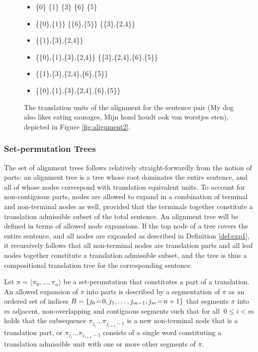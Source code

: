 \begin{figure}[!ht]
\begin{framed}
\small{
\begin{itemize}
\item \{0\} \hfill \{1\} \hfill \{3\} \hfill \{6\} \hfill \{5\} \hfill
\item \{\{0\},\{1\}\} \hfill  \{\{6\},\{5\}\} \hfill \{\{3\},\{2,4\}\}
\item \{\{1\},\{3\},\{2,4\}\}
\item \{\{0\},\{1\},\{3\},\{2,4\}\} \hfill \{\{3\},\{2,4\},\{6\},\{5\}\}
\item \{\{1\},\{3\},\{2,4\},\{6\},\{5\}\}
\item \{\{0\},\{1\},\{3\},\{2,4\},\{6\},\{5\}\}
\end{itemize}
}
\end{framed}
\caption{The translation units of the alignment for the sentence pair (My dog also likes eating sausages, Mijn hond houdt ook van worstjes eten), depicted in Figure \ref{fig:alignment2}.}\label{fig:transequi}
\end{figure}

\subsubsection{Set-permutation Trees}

The set of alignment trees follows relatively straight-forwardly from the notion of parts: an alignment tree is a tree whose root dominates the entire sentence, and all of whose nodes correspond with translation equivalent units. To account for non-contiguous parts, nodes are allowed to expand in a combination of terminal and non-terminal nodes as well, provided that the terminals together constitute a translation admissible subset of the total sentence. An alignment tree will be defined in terms of allowed node expansions. If the top node of a tree covers the entire sentence, and all nodes are expanded as described in Definition \ref{def:exp1}, it recursively follows that all non-terminal nodes are translation parts and all leaf nodes together constitute a translation admissible subset, and the tree is thus a compositional translation tree for the corresponding sentence.

\begin{definition}\label{def:exp1}
Let $\pi = \langle \pi_0, \ldots,\pi_n\rangle$ be a set-permutation that constitutes a part of a translation. An allowed expansion of $\pi$ into parts is described by a segmentation of $\pi$ as an ordered set of indices $B = \{j_0\negthinspace=\negthinspace 0, j_1, \ldots ,j_{m-1},j_m\negthinspace=\negthinspace n+1\}$ that segments $\pi$ into $m$ adjacent, non-overlapping and contiguous segments such that for all $~0\leq i < m$ holds that the subsequence $\pi_{j_i}\ldots\pi_{j_{i+1}-1}$ is a new non-terminal node that is a translation part, or $\pi_{j_i}\ldots\pi_{j_{i+1}-1}$ consists of a single word constituting a translation admissible unit with one or more other segments of $\pi$.
\end{definition}


